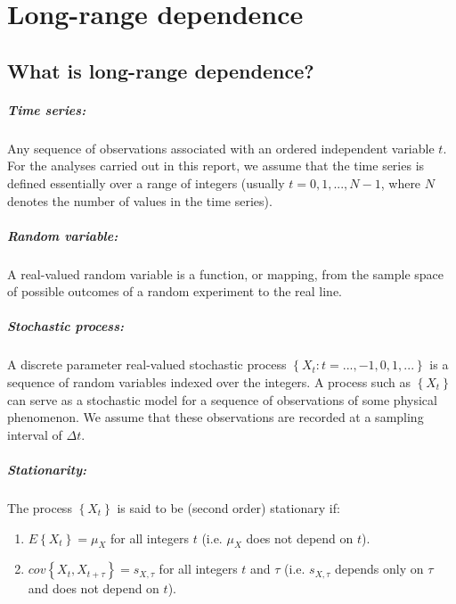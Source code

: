 \documentclass[methods.tex]{subfiles}
\begin{document}
\chapter{Long-range dependence}

\section{What is long-range dependence?}

\paragraph{Time series:} Any sequence of observations associated with an ordered independent variable $t$. For the analyses carried out in this report, we assume that the time series is defined essentially over a range of integers (usually $t = 0 , 1 , ... , N - 1$, where $N$ denotes the number of values in the time series).

\paragraph{Random variable:} A real-valued random variable is a function, or mapping, from the sample space of possible outcomes of a random experiment to the real line.

\paragraph{Stochastic process:} A discrete parameter real-valued stochastic process $\left\{ X_t : t = ... , -1 , 0 , 1 , ... \right\}$ is a sequence of random variables indexed over the integers. A process such as $\left\{ X_t \right\}$ can serve as a stochastic model for a sequence of observations of some physical phenomenon. We assume that these observations are recorded at a sampling interval of $\Delta t$.

\paragraph{Stationarity:} The process $\left\{ X_t \right\} $ is said to be (second order) stationary if:
\begin{enumerate}
\item $E \left\{ X_t \right\} = \mu_X$ for all integers $t$ (i.e. $\mu_X$ does not depend on $t$).
\item $cov \left\{ X_t , X_{t + \tau} \right\} = s_{X , \tau}$ for all integers $t$ and $\tau$ (i.e. $s_{X , \tau}$ depends only on $\tau$ and does not depend on $t$).
\end{enumerate}
\end{document}
